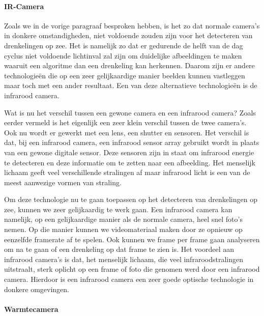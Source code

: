 \paragraph{IR-Camera}

Zoals we in de vorige paragraaf besproken hebben, is het zo dat normale camera's in donkere omstandigheden, niet voldoende zouden zijn voor het detecteren van drenkelingen op zee. Het is namelijk zo dat er gedurende de helft van de dag cyclus niet voldoende lichtinval zal zijn om duidelijke afbeeldingen te maken waaruit een algoritme dan een drenkeling kan herkennen. Daarom zijn er andere technologieën die op een zeer gelijkaardige manier beelden kunnen vastleggen maar toch met een ander resultaat. Een van deze alternatieve technologieën is de infrarood camera. 


Wat is nu het verschil tussen een gewone camera en een infrarood camera? Zoals eerder vermeld is het eigenlijk een zeer klein verschil tussen de twee camera's. Ook nu wordt er gewerkt met een lens, een shutter en sensoren. Het verschil is dat, bij een infrarood camera, een infrarood sensor array gebruikt wordt in plaats van een gewone digitale sensor. Deze sensoren zijn in staat om infrarood energie te detecteren en deze informatie om te zetten naar een afbeelding. Het menselijk lichaam geeft veel verschillende stralingen af maar infrarood licht is een van de meest aanwezige vormen van straling.


Om deze technologie nu te gaan toepassen op het detecteren van drenkelingen op zee, kunnen we zeer gelijkaardig te werk gaan. Een infrarood camera kan namelijk, op een gelijkaardige manier als de normale camera, heel snel foto's nemen. Op die manier kunnen we videomateriaal maken door ze opnieuw op eenzelfde framerate af te spelen. Ook kunnen we frame per frame gaan analyseren om na te gaan of een drenkeling op dat frame te zien is. Het voordeel aan infrarood camera's is dat, het menselijk lichaam, die veel infraroodstralingen uitstraalt, sterk oplicht op een frame of foto die genomen werd door een infrarood camera. Hierdoor is een infrarood camera een zeer goede optische technologie in donkere omgevingen. 

\paragraph{Warmtecamera}


